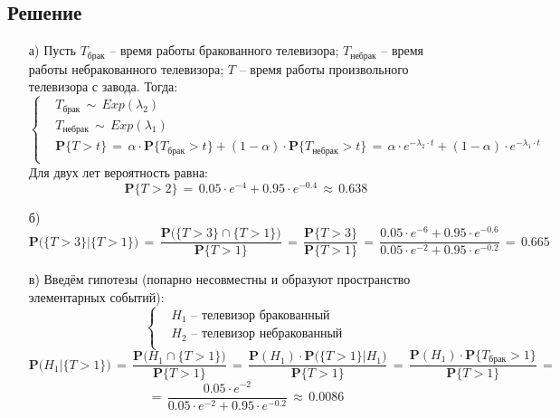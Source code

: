 \documentclass{article}
\begin{document}
\subsection*{Решение}
\begin{enumerate}
\item[а)] Пусть $ T_\text{брак} $ -- время работы бракованного телевизора; $ T_\text{небрак} $ -- время работы небракованного телевизора; $ T $ -- время работы произвольного телевизора с завода. Тогда:
\begin{equation*}
\left\{
\begin{aligned}
& T_\text{брак} \, \sim \, Exp(\lambda_2) \\
& T_\text{небрак} \, \sim \, Exp(\lambda_1) \\
& \mathbf{P} \big\{ T \! > \! t \big\} \, = \, \alpha \! \cdot \! \mathbf{P} \big\{ T_\text{брак} \! > \! t \big\} \! + \! (1 \! - \! \alpha ) \! \cdot \! \mathbf{P} \big\{ T_\text{небрак} \! > \! t \big\} \, = \, \alpha \! \cdot \! e^{-\lambda_2 \cdot t} \! + \! (1 \! - \! \alpha ) \! \cdot \! e^{-\lambda_1 \cdot t} \\
\end{aligned}
\right.
\end{equation*}
Для двух лет вероятность равна:
\[ \mathbf{P} \big\{ T \! > \! 2 \big\} \, = \, 0.05 \! \cdot \! e^{-4} \! + \! 0.95 \! \cdot \! e^{-0.4} \, \approx \, 0.638 \]
\item[б)]
\[ \mathbf{P} \bigg( \big\{ T \! > \! 3 \big\} \big| \big\{ T \! > \! 1 \big\} \bigg) \, = \, \dfrac{\mathbf{P} \bigg( \big\{ T \! > \! 3 \big\} \cap \big\{ T \! > \! 1 \big\} \bigg)}{\mathbf{P} \big\{ T \! > \! 1 \big\}} \, = \, \dfrac{\mathbf{P} \big\{ T \! > \! 3 \big\}}{\mathbf{P} \big\{ T \! > \! 1 \big\}} \, = \, \dfrac{0.05 \! \cdot \! e^{-6} \! + \! 0.95 \! \cdot \! e^{-0.6}}{0.05 \! \cdot \! e^{-2} \! + \! 0.95 \! \cdot \! e^{-0.2}} \, = \, 0.665 \]
\item[в)] Введём гипотезы (попарно несовместны и образуют пространство элементарных событий):
\begin{equation*}
\left\{
\begin{aligned}
& H_1 \text{ -- телевизор бракованный} \\
& H_2 \text{ -- телевизор небракованный} \\
\end{aligned}
\right.
\end{equation*}
\[ \mathbf{P} \bigg( H_1 \big| \big\{ T \! > \! 1 \big\} \bigg) \, = \, \dfrac{\mathbf{P} \bigg( H_1 \cap \big\{ T \! > \! 1 \big\} \bigg)}{\mathbf{P} \big\{ T \! > \! 1 \big\}} \, = \, \dfrac{\mathbf{P}(H_1) \! \cdot \! \mathbf{P} \bigg( \big\{ T \! > \! 1 \big\} \big| H_1 \bigg)}{\mathbf{P} \big\{ T \! > \! 1 \big\}} \, = \, \dfrac{\mathbf{P}(H_1) \! \cdot \! \mathbf{P} \big\{ T_\text{брак} \! > \! 1 \big\}}{\mathbf{P} \big\{ T \! > \! 1 \big\}} \, = \]
\[  = \, \dfrac{0.05 \! \cdot \! e^{-2}}{0.05 \! \cdot \! e^{-2} \! + \! 0.95 \! \cdot \! e^{-0.2}} \, \approx \, 0.0086 \]
\end{enumerate}
\end{document}
